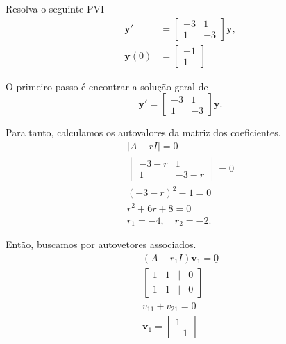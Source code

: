 \begin{exeresol}
  Resolva o seguinte PVI
  \begin{align}
    \pmb{y}' &=
    \begin{bmatrix}
      -3 & 1 \\
      1 & -3
    \end{bmatrix}\pmb{y},\\
    \pmb{y}(0) &=
                 \begin{bmatrix}
                   -1\\
                   1
                 \end{bmatrix}
  \end{align}
\end{exeresol}
\begin{resol}
  O primeiro passo é encontrar a solução geral de
  \begin{equation}
        \pmb{y}' = \begin{bmatrix}
      -3 & 1 \\
      1 & -3
    \end{bmatrix}\pmb{y}.
  \end{equation}

  Para tanto, calculamos os autovalores da matriz dos coeficientes.
  \begin{gather}
    |A-rI|=0\\
    \begin{vmatrix}
      -3-r & 1 \\
      1 & -3-r
    \end{vmatrix} = 0 \\
    (-3-r)^2-1=0 \\
    r^2+6r+8=0 \\
    r_1 = -4,\quad r_2=-2.
  \end{gather}

  Então, buscamos por autovetores associados.
  \begin{gather}
    (A-r_1I)\pmb{v}_1 = \underline{0} \\
    \begin{bmatrix}
      1 & 1 & | & 0\\
      1 & 1 & | & 0
    \end{bmatrix}\\
    v_{11}+v_{21}=0\\
    \pmb{v}_1 =
    \begin{bmatrix}
      1\\
      -1
    \end{bmatrix}
  \end{gather}


\end{resol}
